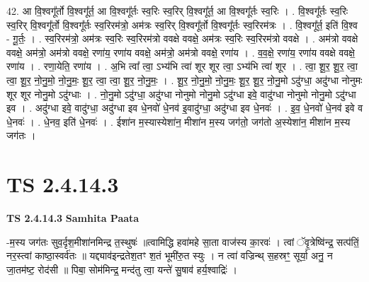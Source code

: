 \documentclass[17pt]{extarticle}
\begin{document}
42. आ वि॒श्वगू᳚र्तो वि॒श्वगू᳚र्त॒ आ वि॒श्वगू᳚र्तः स्व॒रिः स्व॒रिर् वि॒श्वगू᳚र्त॒ आ वि॒श्वगू᳚र्तः स्व॒रिः । . वि॒श्वगू᳚र्तः स्व॒रिः स्व॒रिर् वि॒श्वगू᳚र्तो वि॒श्वगू᳚र्तः स्व॒रिरम॑त्रो॒ अम॑त्रः स्व॒रिर् वि॒श्वगू᳚र्तो वि॒श्वगू᳚र्तः स्व॒रिरम॑त्रः । . वि॒श्वगू᳚र्त॒ इति॑ वि॒श्व - गू॒र्तः॒ । . स्व॒रिरम॑त्रो॒ अम॑त्रः स्व॒रिः स्व॒रिरम॑त्रो ववक्षे ववक्षे॒ अम॑त्रः स्व॒रिः स्व॒रिरम॑त्रो ववक्षे । . अम॑त्रो ववक्षे ववक्षे॒ अम॑त्रो॒ अम॑त्रो ववक्षे॒ रणा॑य॒ रणा॑य ववक्षे॒ अम॑त्रो॒ अम॑त्रो ववक्षे॒ रणा॑य । . व॒व॒क्षे॒ रणा॑य॒ रणा॑य ववक्षे ववक्षे॒ रणा॑य । . रणा॒येति॒ रणा॑य । . अ॒भि त्वा᳚ त्वा॒ ऽभ्य॑भि त्वा॑ शूर शूर त्वा॒ ऽभ्य॑भि त्वा॑ शूर । . त्वा॒ शू॒र॒ शू॒र॒ त्वा॒ त्वा॒ शू॒र॒ नो॒नु॒मो॒ नो॒नु॒मः॒ शू॒र॒ त्वा॒ त्वा॒ शू॒र॒ नो॒नु॒मः॒ । . शू॒र॒ नो॒नु॒मो॒ नो॒नु॒मः॒ शू॒र॒ शू॒र॒ नो॒नु॒मो ऽदु॑ग्धा॒ अदु॑ग्धा नोनुमः शूर शूर नोनु॒मो ऽदु॑ग्धाः । . नो॒नु॒मो ऽदु॑ग्धा॒ अदु॑ग्धा नोनुमो नोनु॒मो ऽदु॑ग्धा इवे॒ वादु॑ग्धा नोनुमो नोनु॒मो ऽदु॑ग्धा इव । . अदु॑ग्धा इवे॒ वादु॑ग्धा॒ अदु॑ग्धा इव धे॒नवो॑ धे॒नव॑ इ॒वादु॑ग्धा॒ अदु॑ग्धा इव धे॒नवः॑ । . इ॒व॒ धे॒नवो॑ धे॒नव॑ इवे व धे॒नवः॑ । . धे॒नव॒ इति॑ धे॒नवः॑ । . ईशा॑न म॒स्यास्येशा॑न॒ मीशा॑न म॒स्य जग॑तो॒ जग॑तो अ॒स्येशा॑न॒ मीशा॑न म॒स्य जग॑तः । \newline
\pagebreak
{}
\section*{ TS 2.4.14.3 }

\textbf{TS 2.4.14.3 } \newline
\textbf{Samhita Paata} \newline

-म॒स्य जग॑तः सुव॒र्दृश॒मीशा॑नमिन्द्र त॒स्थुषः॑ ॥त्वामिद्धि हवा॑महे सा॒ता वाज॑स्य का॒रवः॑ । त्वां ॅवृ॒त्रेष्वि॑न्द्र॒ सत्प॑तिं॒ नर॒स्त्वां काष्ठा॒स्वर्व॑तः ॥ यद्द्याव॑इन्द्रतेश॒तꣳ श॒तं भूमी॑रु॒त स्युः । न त्वा॑ वज्रिन्थ् स॒हस्रꣳ॒॒ सूर्या॒ अनु॒ न जा॒तम॑ष्ट॒ रोद॑सी ॥ पिबा॒ सोम॑मिन्द्र॒ मन्द॑तु त्वा॒ यन्ते॑ सु॒षाव॑ हर्य॒श्वाद्रिः॑ । \newline
\end{document}
